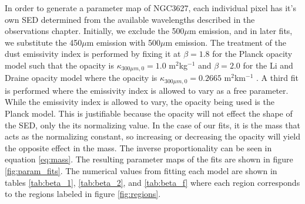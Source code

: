 In order to generate a parameter map of NGC3627, each individual pixel has it's own SED determined from the available wavelengths described in the observations chapter.  Initially, we exclude the 500$\mu$m emission, and in later fits, we substitute the 450$\mu$m emission with 500$\mu$m emission.  The treatment of the dust emissivity index is performed by fixing it at $\beta=1.8$ for the Planck opacity model such that the opacity is $\kappa_{300\mu m,0}=1.0$ m$^2 $kg$^{-1}$ \citep{planckxxv2011} and $\beta=2.0$ for the Li and Draine opacity model where the opacity is $\kappa_{300\mu m,0}=0.2665$ m$^2$km$^{-1}$ \citep{li2001}.  A third fit is performed where the emissivity index is allowed to vary as a free parameter.  While the emissivity index is allowed to vary, the opacity being used is the Planck model.  This is justifiable because the opacity will not effect the shape of the SED, only the its normalizing value.  In the case of our fits, it is the mass that acts as the normalizing constant, so increasing or decreasing the opacity will yield the opposite effect in the mass.  The inverse proportionality can be seen in equation \ref{eq:mass}.  The resulting parameter maps of the fits are shown in figure \ref{fig:param_fits}. The numerical values from fitting each model are shown in tables \ref{tab:beta_1}, \ref{tab:beta_2}, and \ref{tab:beta_f} where each region corresponds to the regions labeled in figure \ref{fig:regions}.

